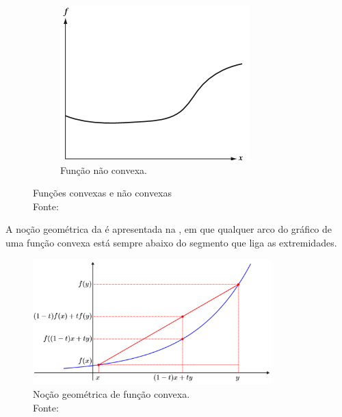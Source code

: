 \documentclass[12pt,a4paper]{scrartcl}
\theoremstyle{definition}%
\begin{document}
\begin{figure}[!h]
\begin{subfigure}[!h]{0.4\textwidth}
	\centering
	\includegraphics[width=\textwidth]{no_convex_function}
	\caption{Função não convexa. \label{fig:funcao_nao_convexa}}
\end{subfigure}
\caption{Funções convexas e não convexas \label{fig:exemplos_funcao_convexa}\\ Fonte: \textcite{Luenberger:2016}}
\end{figure}


A noção geométrica da  é apresentada na , em que qualquer arco do gráfico de uma função convexa está sempre abaixo do segmento que liga as extremidades.


\begin{figure}[!h] 
	\centering
	\includegraphics[width=0.82\textwidth]{funcao_convexa}
	\caption{ Noção geométrica de função convexa. \label{fig:nocao_funcao_convexa} \\ Fonte: \textcite{Evelin2017}}
\end{figure}
\end{document}
